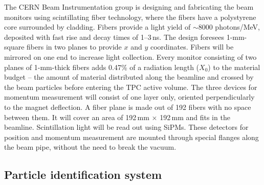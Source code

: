 The CERN Beam Instrumentation group is designing and fabricating
 the beam monitors %
 using scintillating fiber technology, where %
 the fibers have a polystyrene core surrounded by cladding. Fibers provide a light yield of $\sim$8000 photons/MeV, deposited with fast rise and decay times of 1--3\,ns. The design foresees 1-mm-square fibers in two planes to provide $x$ and $y$ coordinates. Fibers will be mirrored on one end to increase
light collection.  Every monitor consisting of two planes of 1-mm-thick fibers adds 0.47\% of a radiation length ($X_0$) to the material budget -- the amount of material distributed along the beamline and crossed by the beam particles before entering the TPC active volume. 
The three devices for momentum measurement will consist of one layer only, oriented perpendicularly to the magnet deflection.
A fiber plane is made out of 192 fibers with no space between them. It will cover an area of 192\,mm $\times$ 192\,mm and fits in the beamline.
Scintillation light will be read out using SiPMs.
%
These detectors for position and momentum measurement are 
mounted through special flanges along the beam pipe, without the need to break the vacuum.


\subsection{Particle identification system}

